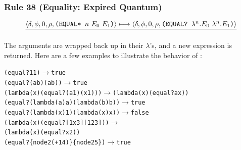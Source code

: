 \subsubsection*{Rule 38 (Equality: Expired Quantum)}
\[
\frac{\cfg{\delta}{\phi}{0}{\rho}{\THOR{(EQUAL* }n\ E_0\ E_1\THOR{)}}\redsto
      \cfg{\delta}{\phi}{0}{\rho}{\THOR{(EQUAL? }\lambda^n.E_0\ \lambda^n.E_1\THOR{)}}}
     {}
\]
The arguments are wrapped back up in their \(\lambda\)'s, and a new
 expression is returned. Here are a few examples to illustrate the
behavior of :
\begin{alltt}
(equal?  1 1) \(\longrightarrow\)  true
(equal?  (a b) (a b)) \(\longrightarrow\)  true
(lambda (x) (equal?  (a 1) (x 1))) \(\longrightarrow\)  (lambda (x) (equal?  a x))
(equal?  (lambda (a) a) (lambda (b) b)) \(\longrightarrow\)  true
(equal?  (lambda (x) 1) (lambda (x) x)) \(\longrightarrow\)  false
(lambda (x) (equal?  [1 x 3] [1 2 3])) \(\longrightarrow\)
        (lambda (x) (equal?  x 2))
(equal?  \{node 2 (+ 1 4)\} \{node 2 5\}) \(\longrightarrow\)  true
\end{alltt}
